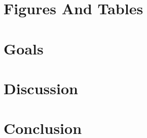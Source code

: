 \section{Figures And Tables}
\label{figures-and-tables}


\section{Goals}
\label{chapter5-goals}



\section{Discussion}
\label{discussion}

\section{Conclusion}
\label{conclusion}

